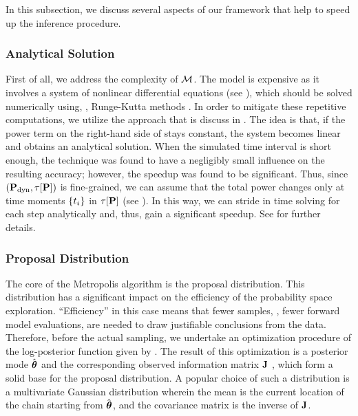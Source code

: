 In this subsection, we discuss several aspects of our framework that help to speed up the inference procedure.

\subsubsection{Analytical Solution} 
First of all, we address the complexity of $\model$. The model is expensive as it involves a system of nonlinear differential equations (see ), which should be solved numerically using, \eg, Runge-Kutta methods \cite{press2007}. In order to mitigate these repetitive computations, we utilize the approach that is discuss in \cite{ukhov2012}.
The idea is that, if the power term on the right-hand side of  stays constant, the system becomes linear and obtains an analytical solution. When the simulated time interval is short enough, the technique was found to have a negligibly small influence on the resulting accuracy; however, the speedup was found to be significant.
Thus, since $(\mathbf{P}_{\text{dyn}}, \tau[\mathbf{P}])$ is fine-grained, we can assume that the total power changes only at time moments $\{ t_i \}$ in $\tau[\mathbf{P}]$ (see ). In this way, we can stride in time solving  for each step analytically and, thus, gain a significant speedup. See \cite{ukhov2012} for further details.

\subsubsection{Proposal Distribution} 
The core of the Metropolis algorithm is the proposal distribution. This distribution has a significant impact on the efficiency of the probability space exploration. ``Efficiency'' in this case means that fewer samples, \ie, fewer forward model evaluations, are needed to draw justifiable conclusions from the data.
Therefore, before the actual sampling, we undertake an optimization procedure of the log-posterior function given by . The result of this optimization is a posterior mode $\hat{{\boldsymbol\theta}}$ and the corresponding observed information matrix $\mathbf{J}$ \cite{gelman2004}, which form a solid base for the proposal distribution.
A popular choice of such a distribution is a multivariate Gaussian distribution wherein the mean is the current location of the chain starting from $\hat{{\boldsymbol\theta}}$, and the covariance matrix is the inverse of $\mathbf{J}$.

